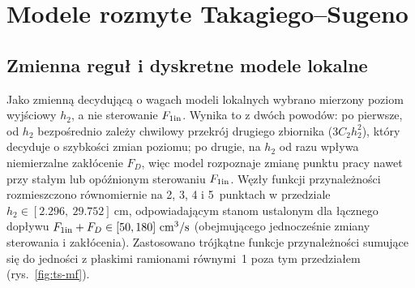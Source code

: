 \chapter{Modele rozmyte Takagiego--Sugeno}
\section{Zmienna reguł i dyskretne modele lokalne}
Jako zmienną decydującą o wagach modeli lokalnych wybrano mierzony poziom wyjściowy $h_2$, a nie sterowanie $F_{1\mathrm{in}}$. Wynika to z dwóch powodów: po pierwsze, od $h_2$ bezpośrednio zależy chwilowy przekrój drugiego zbiornika ($3C_2h_2^2$), który decyduje o szybkości zmian poziomu; po drugie, na $h_2$ od razu wpływa niemierzalne zakłócenie $F_D$, więc model rozpoznaje zmianę punktu pracy nawet przy stałym lub opóźnionym sterowaniu $F_{1\mathrm{in}}$. Węzły funkcji przynależności rozmieszczono równomiernie na 2, 3, 4 i 5~punktach w przedziale $h_2\in[\num{2.296},\ \num{29.752}]\ \mathrm{cm}$, odpowiadającym stanom ustalonym dla łącznego dopływu $F_{1\mathrm{in}}+F_D\in[50,180]\ \mathrm{cm^3/s}$ (obejmującego jednocześnie zmiany sterowania i zakłócenia). Zastosowano trójkątne funkcje przynależności sumujące się do jedności z płaskimi ramionami równymi~1 poza tym przedziałem (rys.~\ref{fig:ts-mf}).

